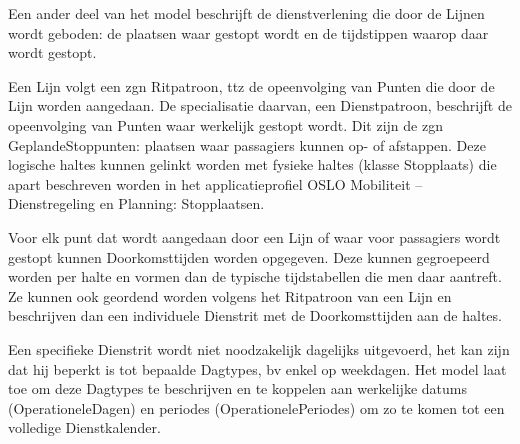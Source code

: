 Een ander deel van het model beschrijft de dienstverlening die door de Lijnen wordt geboden: de plaatsen waar gestopt wordt en de tijdstippen waarop daar wordt gestopt.

Een Lijn volgt een zgn Ritpatroon, ttz de opeenvolging van Punten die door de Lijn worden aangedaan. De specialisatie daarvan, een Dienstpatroon, beschrijft de opeenvolging van Punten waar werkelijk gestopt wordt. Dit zijn de zgn GeplandeStoppunten: plaatsen waar passagiers kunnen op- of afstappen. Deze logische haltes kunnen gelinkt worden met fysieke haltes (klasse Stopplaats) die apart beschreven worden in het applicatieprofiel OSLO Mobiliteit – Dienstregeling en Planning: Stopplaatsen.

Voor elk punt dat wordt aangedaan door een Lijn of waar voor passagiers wordt gestopt kunnen Doorkomsttijden worden opgegeven. Deze kunnen gegroepeerd worden per halte en vormen dan de typische tijdstabellen die men daar aantreft. Ze kunnen ook geordend worden volgens het Ritpatroon van een Lijn en beschrijven dan een individuele Dienstrit met de Doorkomsttijden aan de haltes.

Een specifieke Dienstrit wordt niet noodzakelijk dagelijks uitgevoerd, het kan zijn dat hij beperkt is tot bepaalde Dagtypes, bv enkel op weekdagen. Het model laat toe om deze Dagtypes te beschrijven en te koppelen aan werkelijke datums (OperationeleDagen) en periodes (OperationelePeriodes) om zo te komen tot een volledige Dienstkalender.

